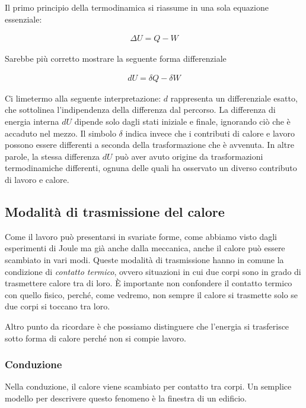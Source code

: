 Il primo principio della termodinamica si riassume in una sola
equazione essenziale:

\begin{align}
    \Delta U = Q - W
\end{align}

\noindent Sarebbe più corretto mostrare la seguente forma differenziale

\begin{tcolorbox}[colback = red!30, colframe = red!30!black, title = {Primo principio della termodinamica}]
\begin{align}
    dU = \delta Q - \delta W
\end{align}
\end{tcolorbox}

\noindent Ci limetermo alla seguente interpretazione: $d$ rappresenta
un differenziale esatto, che sottolinea l'indipendenza della differenza
dal percorso. La differenza di energia interna $dU$ dipende solo dagli
stati iniziale e finale, ignorando ciò che è accaduto nel mezzo.
Il simbolo $\delta$ indica invece che i contributi di calore e lavoro
possono essere differenti a seconda della trasformazione che è
avvenuta. In altre parole, la stessa differenza $dU$ può aver
avuto origine da trasformazioni termodinamiche differenti, ognuna
delle quali ha osservato un diverso contributo di lavoro e calore.

\subsection{Modalità di trasmissione del calore}
Come il lavoro può presentarsi in svariate forme, come abbiamo
visto dagli esperimenti di Joule ma già anche dalla meccanica,
anche il calore può essere scambiato in vari modi. Queste modalità
di trasmissione hanno in comune la condizione di \textit{contatto
termico}, ovvero situazioni in cui due corpi sono in grado di
trasmettere calore tra di loro. È importante non confondere il
contatto termico con quello fisico, perché, come vedremo, non
sempre il calore si trasmette solo se due corpi si toccano tra loro.

Altro punto da ricordare è che possiamo distinguere che l'energia
si trasferisce sotto forma di calore perché non si compie lavoro.

\subsubsection{Conduzione}
Nella conduzione, il calore viene scambiato per contatto tra corpi.
Un semplice modello per descrivere questo fenomeno è la finestra di
un edificio.

